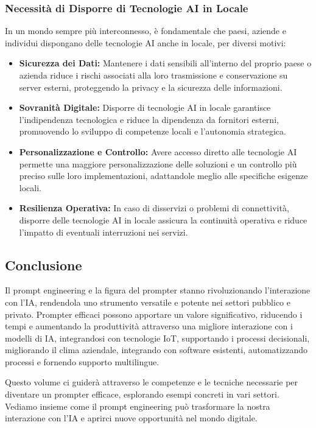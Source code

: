         \subsubsection{Necessità di Disporre di Tecnologie AI in Locale}
            In un mondo sempre più interconnesso, è fondamentale che paesi, aziende e individui dispongano delle tecnologie AI anche in locale, per diversi motivi:
            \begin{itemize}
                \item \textbf{Sicurezza dei Dati:} Mantenere i dati sensibili all'interno del proprio paese o azienda riduce i rischi associati alla loro trasmissione e conservazione su server esterni, proteggendo la privacy e la sicurezza delle informazioni.
    
                \item \textbf{Sovranità Digitale:} Disporre di tecnologie AI in locale garantisce l'indipendenza tecnologica e riduce la dipendenza da fornitori esterni, promuovendo lo sviluppo di competenze locali e l'autonomia strategica.
    
                \item \textbf{Personalizzazione e Controllo:} Avere accesso diretto alle tecnologie AI permette una maggiore personalizzazione delle soluzioni e un controllo più preciso sulle loro implementazioni, adattandole meglio alle specifiche esigenze locali.
    
                \item \textbf{Resilienza Operativa:} In caso di disservizi o problemi di connettività, disporre delle tecnologie AI in locale assicura la continuità operativa e riduce l'impatto di eventuali interruzioni nei servizi.
            \end{itemize}
        
    \subsection{Conclusione}
        Il prompt engineering e la figura del prompter stanno rivoluzionando l'interazione con l'IA, rendendola uno strumento versatile e potente nei settori pubblico e privato. Prompter efficaci possono apportare un valore significativo, riducendo i tempi e aumentando la produttività attraverso una migliore interazione con i modelli di IA, integrandosi con tecnologie IoT, supportando i processi decisionali, migliorando il clima aziendale, integrando con software esistenti, automatizzando processi e fornendo supporto multilingue.
    
        Questo volume ci guiderà attraverso le competenze e le tecniche necessarie per diventare un prompter efficace, esplorando esempi concreti in vari settori. Vediamo insieme come il prompt engineering può trasformare la nostra interazione con l'IA e aprirci nuove opportunità nel mondo digitale.

